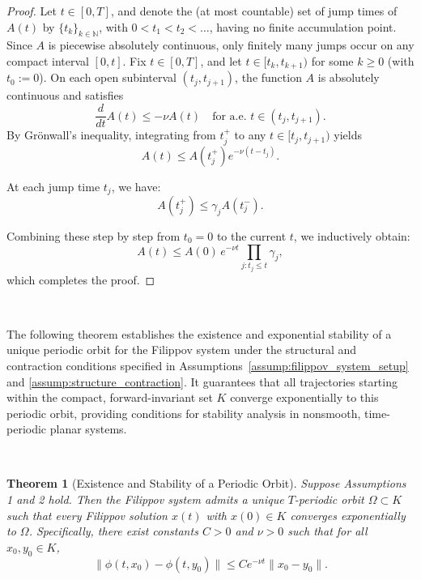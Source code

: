 \documentclass[11pt]{article}
\newtheorem{theorem}{Theorem}
\begin{document}
\begin{proof}
Let \( t \in [0,T] \), and denote the (at most countable) set of jump times of \( A(t) \) by \( \{t_k\}_{k \in \mathbb{N}} \), with \( 0 < t_1 < t_2 < \dots \), having no finite accumulation point. Since \( A \) is piecewise absolutely continuous, only finitely many jumps occur on any compact interval \( [0,t] \). Fix \( t \in [0,T] \), and let \( t \in [t_k, t_{k+1}) \) for some \( k \geq 0 \) (with \( t_0 := 0 \)). On each open subinterval \( (t_j, t_{j+1}) \), the function \( A \) is absolutely continuous and satisfies
\[
\frac{d}{dt} A(t) \le -\nu A(t) \quad \text{for a.e. } t \in (t_j, t_{j+1}).
\]
By Grönwall’s inequality, integrating from \( t_j^+ \) to any \( t \in [t_j, t_{j+1}) \) yields
\[
A(t) \le A(t_j^+) e^{-\nu(t - t_j)}.
\]

At each jump time \( t_j \), we have:
\[
A(t_j^+) \le \gamma_j A(t_j^-).
\]

Combining these step by step from \( t_0 = 0 \) to the current \( t \), we inductively obtain:
\[
A(t) \le A(0)\, e^{-\nu t} \prod_{j: t_j \le t} \gamma_j,
\]
which completes the proof.
\end{proof}


\



The following theorem establishes the existence and exponential stability of a unique periodic orbit for the Filippov system under the structural and contraction conditions specified in Assumptions~\ref{assump:filippov_system_setup} and \ref{assump:structure_contraction}. It guarantees that all trajectories starting within the compact, forward-invariant set \(K\) converge exponentially to this periodic orbit, providing conditions for stability analysis in nonsmooth, time-periodic planar systems.

\

\begin{theorem}[Existence and Stability of a Periodic Orbit]\label{thm:existence_stability}
Suppose Assumptions 1 and 2 hold. Then the Filippov system admits a unique $T$-periodic orbit $\Omega \subset K$ such that every Filippov solution $x(t)$ with $x(0) \in K$ converges exponentially to $\Omega$. Specifically, there exist constants $C > 0$ and $\nu > 0$ such that for all $x_0, y_0 \in K$,
		\begin{equation} \label{eq:euclidean_contraction}
			\|\phi(t,x_0) - \phi(t,y_0)\| \leq C e^{-\nu t} \|x_0 - y_0\|.
		\end{equation}
	\end{theorem}
\end{document}
